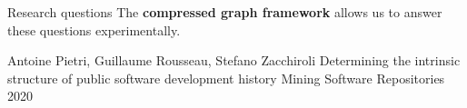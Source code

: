 \documentclass[aspectratio=169,xcolor=table]{beamer}
\begin{document}
\begin{frame}
\begin{block}{Research questions}
            The \textbf{compressed graph framework} allows us to answer these
            questions experimentally.

            \footnotesize
            \begin{thebibliography}{swhforks}
                 Antoine Pietri, Guillaume Rousseau, Stefano Zacchiroli\newblock
                Determining the intrinsic structure of public software development history\newblock
                Mining Software Repositories 2020\newblock
            \end{thebibliography}
        \end{block}
    \end{frame}



\end{document}
